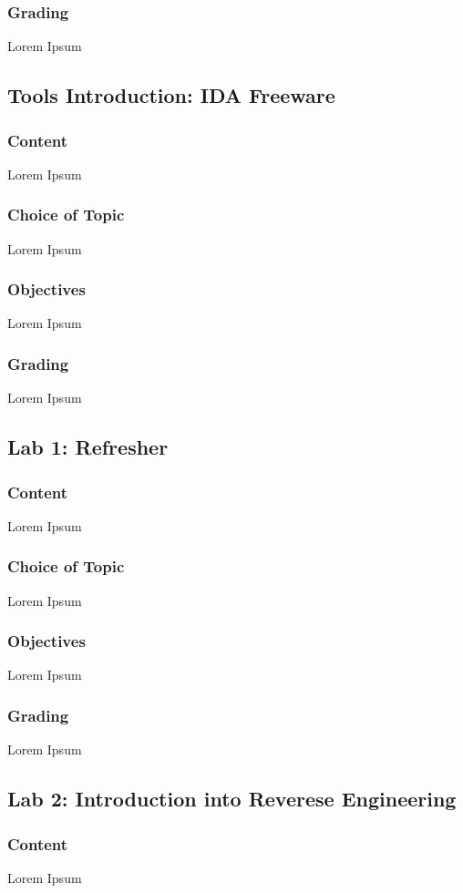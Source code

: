\subsubsection*{Grading}
Lorem Ipsum

\subsection{Tools Introduction: IDA Freeware}
\subsubsection*{Content}
Lorem Ipsum
\subsubsection*{Choice of Topic}
Lorem Ipsum
\subsubsection*{Objectives}
Lorem Ipsum
\subsubsection*{Grading}
Lorem Ipsum

\subsection{Lab 1: Refresher}
\subsubsection*{Content}
Lorem Ipsum
\subsubsection*{Choice of Topic}
Lorem Ipsum
\subsubsection*{Objectives}
Lorem Ipsum
\subsubsection*{Grading}
Lorem Ipsum

\subsection{Lab 2: Introduction into Reverese Engineering}
\subsubsection*{Content}
Lorem Ipsum
